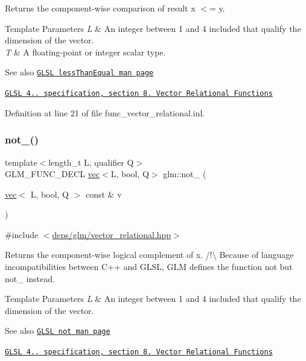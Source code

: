 Returns the component-\/wise comparison of result x $<$= y.


\begin{DoxyTemplParams}{Template Parameters}
{\em L} & An integer between 1 and 4 included that qualify the dimension of the vector. \\
\hline
{\em T} & A floating-\/point or integer scalar type.\\
\hline
\end{DoxyTemplParams}
\begin{DoxySeeAlso}{See also}
\href{http://www.opengl.org/sdk/docs/manglsl/xhtml/lessThanEqual.xml}{\tt G\+L\+SL less\+Than\+Equal man page} 

\href{http://www.opengl.org/registry/doc/GLSLangSpec.4.20.8.pdf}{\tt G\+L\+SL 4.. specification, section 8. Vector Relational Functions} 
\end{DoxySeeAlso}


Definition at line 21 of file func\+\_\+vector\+\_\+relational.\+inl.

\mbox{\label{group__core__func__vector__relational_ga464f1392c934f69a917ab8bb6eda5b09}} 
\subsubsection{\texorpdfstring{not\+\_\+()}{not\_()}}
{\footnotesize\ttfamily template$<$length\+\_\+t L, qualifier Q$>$ \\
G\+L\+M\+\_\+\+F\+U\+N\+C\+\_\+\+D\+E\+CL \hyperlink{structglm_1_1vec}{vec}$<$L, bool, Q$>$ glm\+::not\+\_\+ (\begin{DoxyParamCaption}\item[{\hyperlink{structglm_1_1vec}{vec}$<$ L, bool, Q $>$ const \&}]{v }\end{DoxyParamCaption})}



{\ttfamily \#include $<$\hyperlink{vector__relational_8hpp}{deps/glm/vector\+\_\+relational.\+hpp}$>$}

Returns the component-\/wise logical complement of x. /!\textbackslash{} Because of language incompatibilities between C++ and G\+L\+SL, G\+LM defines the function not but not\+\_\+ instead.


\begin{DoxyTemplParams}{Template Parameters}
{\em L} & An integer between 1 and 4 included that qualify the dimension of the vector.\\
\hline
\end{DoxyTemplParams}
\begin{DoxySeeAlso}{See also}
\href{http://www.opengl.org/sdk/docs/manglsl/xhtml/not.xml}{\tt G\+L\+SL not man page} 

\href{http://www.opengl.org/registry/doc/GLSLangSpec.4.20.8.pdf}{\tt G\+L\+SL 4.. specification, section 8. Vector Relational Functions} 
\end{DoxySeeAlso}


